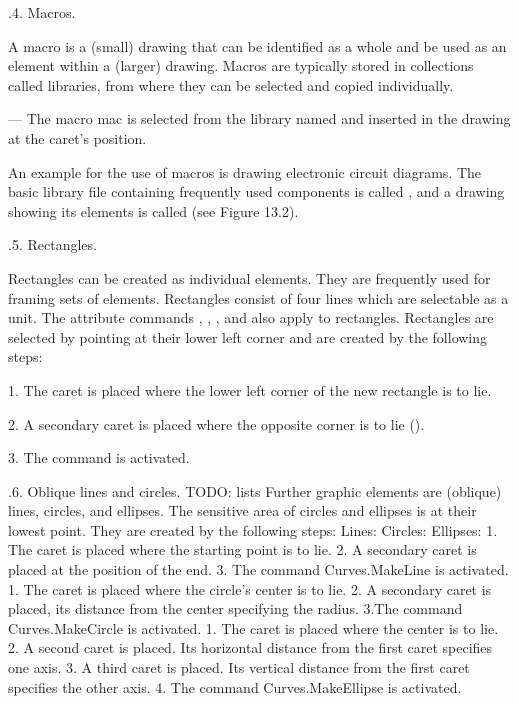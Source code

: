 .4. Macros.

A macro is a (small) drawing that can be identified as a whole and be used as an element within a (larger) drawing. Macros are typically stored in collections called libraries, from where they can be selected and copied individually.

 --- The macro mac is selected from the library named  and inserted in the drawing at the caret's position.

An example for the use of macros is drawing electronic circuit diagrams. The basic library file containing frequently used  components is called , and a drawing showing its elements is called  (see Figure 13.2).


.5. Rectangles.

Rectangles can be created as individual elements. They are frequently used for framing sets of elements. Rectangles consist of four lines which are selectable as a unit. The attribute commands , , , and  also apply to rectangles. Rectangles are selected by pointing at their lower left corner and are created by the following steps:

\item{1.} The caret is placed where the lower left corner of the new rectangle is to lie.
\item{2.} A secondary caret is placed where the opposite corner is to lie ().
\item{3.} The command  is activated.

.6. Oblique lines and circles.
TODO: lists
Further graphic elements are (oblique) lines, circles, and ellipses. The sensitive area of circles and ellipses is at their lowest point. They are created by the following steps:
Lines: Circles: Ellipses:
1. The caret is placed where the starting point is to lie. 2. A secondary caret is placed at the position of the end. 3. The command Curves.MakeLine is activated.
1. The caret is placed where the circle's center is to lie.
2. A secondary caret is placed, its distance from the center specifying the radius. 3.The command Curves.MakeCircle is activated.
1. The caret is placed where the center is to lie.
2. A second caret is placed. Its horizontal distance from the first caret specifies one axis. 3. A third caret is placed. Its vertical distance from the first caret specifies the other axis. 4. The command Curves.MakeEllipse is activated.

